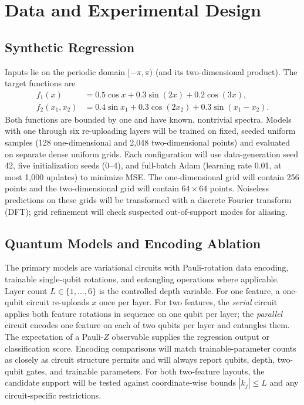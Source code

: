 \documentclass[conference]{IEEEtran}
\begin{document}
\section{Data and Experimental Design}
\subsection{Synthetic Regression}
Inputs lie on the periodic domain $[-\pi,\pi)$ (and its two-dimensional
product). The target functions are
\begin{align}
f_1(x) &= 0.5\cos x+0.3\sin(2x)+0.2\cos(3x),\\
f_2(x_1,x_2) &= 0.4\sin x_1+0.3\cos(2x_2)
                  +0.3\sin(x_1-x_2).
\end{align}
Both functions are bounded by one and have known, nontrivial spectra. Models
with one through six re-uploading layers will be trained on fixed,
seeded uniform samples (128 one-dimensional and 2,048 two-dimensional
points) and evaluated on separate dense uniform grids. Each configuration
will use data-generation seed 42, five initialization seeds (0--4), and
full-batch Adam (learning rate 0.01, at most 1,000 updates) to minimize MSE.
The one-dimensional grid will contain 256 points and the two-dimensional
grid will contain $64\times64$ points. Noiseless predictions on these grids
will be transformed with a discrete Fourier transform (DFT); grid
refinement will check suspected out-of-support modes for aliasing.

\subsection{Quantum Models and Encoding Ablation}
The primary models are variational circuits with Pauli-rotation data
encoding, trainable single-qubit rotations, and entangling operations where
applicable. Layer count $L\in\{1,\ldots,6\}$ is the controlled depth variable.
For one feature, a one-qubit circuit re-uploads $x$ once per layer. For two
features, the \emph{serial} circuit applies both feature rotations in sequence
on one qubit per layer; the \emph{parallel} circuit encodes one feature on
each of two qubits per layer and entangles them. The expectation of a Pauli-$Z$
observable supplies the regression output or classification score. Encoding
comparisons will match trainable-parameter counts as closely as circuit
structure permits and will always report qubits, depth, two-qubit gates, and
trainable parameters. For both two-feature layouts, the candidate support
will be tested against coordinate-wise bounds $|k_j|\leq L$ and any
circuit-specific restrictions.
\end{document}
